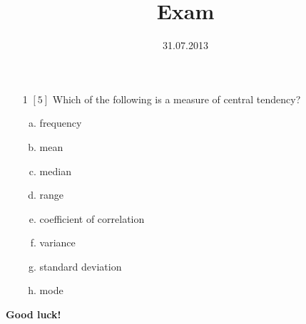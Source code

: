 \documentclass{article}
\title{Exam}
\date{31.07.2013}
\begin{document}
\maketitle{}
\begin{itemize}
\item[1] {\small $\left[5\right]$ }Which of the following is a measure of central tendency?
\begin{enumerate}[(a)]
\item frequency 
\item mean 
\item median 
\item range 
\item coefficient of correlation 
\item variance 
\item standard deviation 
\item mode 
\end{enumerate}
\end{itemize}
{\bf Good luck! }\newpage
\end{document}
